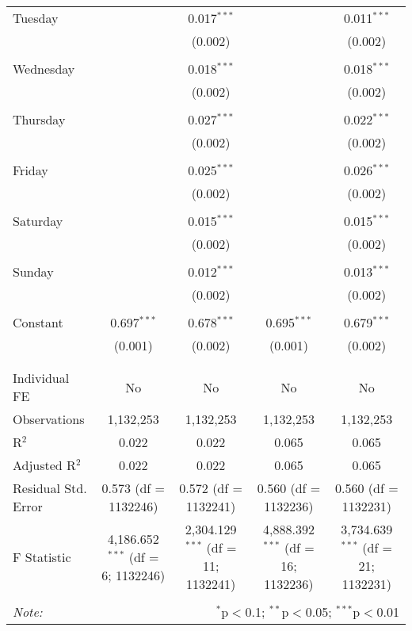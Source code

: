 \documentclass[
]{article}
\begin{document}
\begin{table}[!htbp]
{\begin{tabular}{@{\extracolsep{5pt}}lcccc}
 Tuesday &  & 0.017$^{***}$ &  & 0.011$^{***}$ \\ 
  &  & (0.002) &  & (0.002) \\ 
  & & & & \\ 
 Wednesday &  & 0.018$^{***}$ &  & 0.018$^{***}$ \\ 
  &  & (0.002) &  & (0.002) \\ 
  & & & & \\ 
 Thursday &  & 0.027$^{***}$ &  & 0.022$^{***}$ \\ 
  &  & (0.002) &  & (0.002) \\ 
  & & & & \\ 
 Friday &  & 0.025$^{***}$ &  & 0.026$^{***}$ \\ 
  &  & (0.002) &  & (0.002) \\ 
  & & & & \\ 
 Saturday &  & 0.015$^{***}$ &  & 0.015$^{***}$ \\ 
  &  & (0.002) &  & (0.002) \\ 
  & & & & \\ 
 Sunday &  & 0.012$^{***}$ &  & 0.013$^{***}$ \\ 
  &  & (0.002) &  & (0.002) \\ 
  & & & & \\ 
 Constant & 0.697$^{***}$ & 0.678$^{***}$ & 0.695$^{***}$ & 0.679$^{***}$ \\ 
  & (0.001) & (0.002) & (0.001) & (0.002) \\ 
  & & & & \\ 
\hline \\[-1.8ex] 
Individual FE & No & No & No & No \\ 
Observations & 1,132,253 & 1,132,253 & 1,132,253 & 1,132,253 \\ 
R$^{2}$ & 0.022 & 0.022 & 0.065 & 0.065 \\ 
Adjusted R$^{2}$ & 0.022 & 0.022 & 0.065 & 0.065 \\ 
Residual Std. Error & 0.573 (df = 1132246) & 0.572 (df = 1132241) & 0.560 (df = 1132236) & 0.560 (df = 1132231) \\ 
F Statistic & 4,186.652$^{***}$ (df = 6; 1132246) & 2,304.129$^{***}$ (df = 11; 1132241) & 4,888.392$^{***}$ (df = 16; 1132236) & 3,734.639$^{***}$ (df = 21; 1132231) \\ 
\hline 
\hline \\[-1.8ex] 
\textit{Note:}  & \multicolumn{4}{r}{$^{*}$p$<$0.1; $^{**}$p$<$0.05; $^{***}$p$<$0.01} \\ 
\end{tabular}
} 
\end{table} 
\newpage
\end{document}
